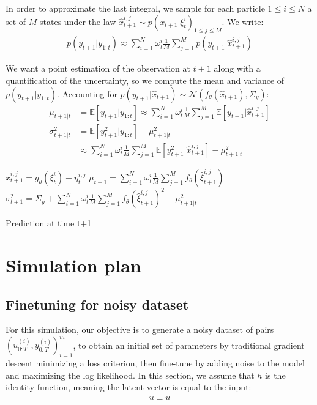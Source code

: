 \documentclass[10pt,a4paper]{report}
\begin{document}
In order to approximate the last integral, we sample for each particle $1 \leq i \leq N$ a set of $M$ states under the law $\hat x_{t+1}^{i, j} \sim p(x_{t+1}|\xi_t^i)_{1 \leq j \leq M}$.
We write:
\begin{align}
	p(y_{t+1}|y_{1:t}) \approx \sum_{i=1}^N \omega_t^i \frac{1}{M} \sum_{j=1}^M p(y_{t+1}|\hat x_{t+1}^{i, j})
\end{align}

We want a point estimation of the observation at $t+1$ along with a quantification of the uncertainty, so we compute the mean and variance of $p(y_{t+1}|y_{1:t})$.
Accounting for $p(y_{t+1} | \hat x_{t+1}) \sim \mathcal{N}(f_\theta(\hat x_{t+1}), \Sigma_y)$:
\begin{align*}
	\mu_{t+1|t}      & = \mathbb{E}[y_{t+1}|y_{1:t}] \approx \sum_{i=1}^N \omega_t^i \frac{1}{M} \sum_{j=1}^M \mathbb{E}[y_{t+1}|\hat x_{t+1}^{i, j}] \\
	\sigma_{t+1|t}^2 & = \mathbb{E}[y_{t+1}^2|y_{1:t}] - \mu_{t+1|t}^2                                                                                \\
			 & \approx \sum_{i=1}^N {\omega_t^i} \frac{1}{M} \sum_{j=1}^M \mathbb{E}[y_{t+1}^2|\hat x_{t+1}^{i, j}] - \mu_{t+1|t}^2
\end{align*}

\begin{algorithm}
	$\hat x_{t+1}^{i, j} = g_\theta(\xi_t^i) + \eta_t^{i, j}$\;
	$\mu_{t+1} = \sum_{i=1}^N \omega_t^i \frac{1}{M} \sum_{j=1}^M f_\theta(\hat \xi_{t+1}^{i, j})$\;
	$\sigma_{t+1}^2 = \Sigma_y + \sum_{i=1}^N \omega_t^i \frac{1}{M} \sum_{j=1}^M f_\theta(\hat \xi_{t+1}^{i, j})^2 - \mu_{t+1|t}^2$\;
	\caption{Prediction at time {t+1}}
\end{algorithm}


\chapter{Simulation plan}
\section{Finetuning for noisy dataset}
For this simulation, our objective is to generate a noisy dataset of pairs $(u_{0:T}^{(i)}, y_{0:T}^{(i)})_{i=1}^m$, to obtain an initial set of parameters by traditional gradient descent minimizing a loss criterion, then fine-tune by adding noise to the model and maximizing the log likelihood.
In this section, we assume that $h$ is the identity function, meaning the latent vector is equal to the input:
$$
	\tilde u \equiv u
$$
\end{document}
